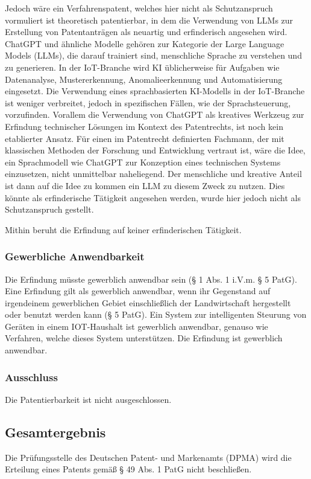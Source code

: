 Jedoch wäre ein Verfahrenspatent, welches hier nicht als Schutzanspruch vormuliert
ist theoretisch patentierbar, in dem die Verwendung von LLMs zur 
Erstellung von Patentanträgen als neuartig und erfinderisch angesehen wird.
ChatGPT und ähnliche Modelle gehören zur Kategorie der Large Language Models (LLMs), 
die darauf trainiert sind, menschliche Sprache zu verstehen und zu generieren. 
In der IoT-Branche wird KI üblicherweise für Aufgaben wie Datenanalyse, 
Mustererkennung, Anomalieerkennung und Automatisierung eingesetzt. 
Die Verwendung eines sprachbasierten KI-Modells 
in der IoT-Branche ist weniger verbreitet, jedoch
in spezifischen Fällen, wie der Sprachsteuerung, vorzufinden.
Vorallem die Verwendung von ChatGPT als kreatives Werkzeug 
zur Erfindung technischer Lösungen im Kontext des Patentrechts, 
ist noch kein etablierter Ansatz. Für einen im Patentrecht definierten Fachmann, 
der mit klassischen Methoden der Forschung und Entwicklung vertraut ist, 
wäre die Idee, ein Sprachmodell wie ChatGPT zur 
Konzeption eines technischen Systems einzusetzen, nicht unmittelbar naheliegend.
Der menschliche und kreative Anteil ist dann auf die Idee zu 
kommen ein LLM zu diesem Zweck zu nutzen.
Dies könnte als erfinderische Tätigkeit angesehen werden,
wurde hier jedoch nicht als Schutzanspruch gestellt.

Mithin beruht die Erfindung auf keiner erfinderischen Tätigkeit.
\subsubsection{Gewerbliche Anwendbarkeit}
Die Erfindung müsste gewerblich anwendbar sein (§ 1 Abs. 1 i.V.m. § 5 PatG).
Eine Erfindung gilt als gewerblich anwendbar, wenn ihr Gegenstand auf irgendeinem gewerblichen
Gebiet einschließlich der Landwirtschaft hergestellt oder benutzt werden kann (§ 5 PatG).
Ein System zur intelligenten Steurung von Geräten in einem IOT-Haushalt ist gewerblich anwendbar,
genauso wie Verfahren, welche dieses System unterstützen.
Die Erfindung ist gewerblich anwendbar.


\subsubsection{Ausschluss}
Die Patentierbarkeit ist nicht ausgeschlossen.

\subsection{Gesamtergebnis}
Die Prüfungsstelle des Deutschen Patent- und Markenamts (DPMA) wird die Erteilung eines
Patents gemäß § 49 Abs. 1 PatG nicht beschließen.